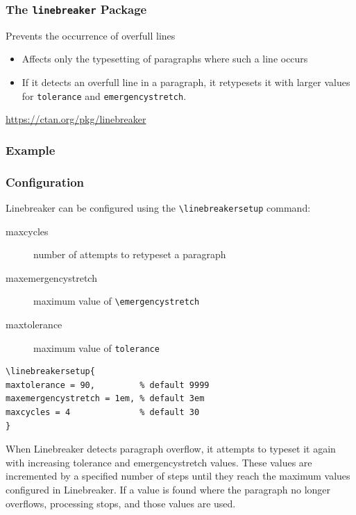 \begin{frame}[fragile]
  \frametitle{The \texttt{linebreaker} Package}
  Prevents the occurrence of overfull lines
  \begin{itemize}
    \item Affects only the typesetting of paragraphs where such a line occurs
    \item If it detects an overfull line in a paragraph, it retypesets it with larger values for
      \verb|tolerance| and \verb|emergencystretch|.
  \end{itemize}
  \url{https://ctan.org/pkg/linebreaker}
\end{frame}

\begin{frame}
  \frametitle{Example}
\end{frame}

\begin{frame}[fragile]
  \frametitle{Configuration}
  Linebreaker can be configured using the \verb|\linebreakersetup| command:
  \begin{description}
    \item[maxcycles] number of attempts to retypeset a paragraph
    \item[maxemergencystretch] maximum value of \verb|\emergencystretch|
    \item[maxtolerance]  maximum value of \verb|tolerance|
  \end{description}
\begin{verbatim}
\linebreakersetup{
maxtolerance = 90,         % default 9999
maxemergencystretch = 1em, % default 3em
maxcycles = 4              % default 30
}
\end{verbatim}

\end{frame}

When Linebreaker detects paragraph overflow, it attempts to typeset it again
with increasing tolerance and emergencystretch values. These values are
incremented by a specified number of steps until they reach the maximum values
configured in Linebreaker. If a value is found where the paragraph no longer
overflows, processing stops, and those values are used.

